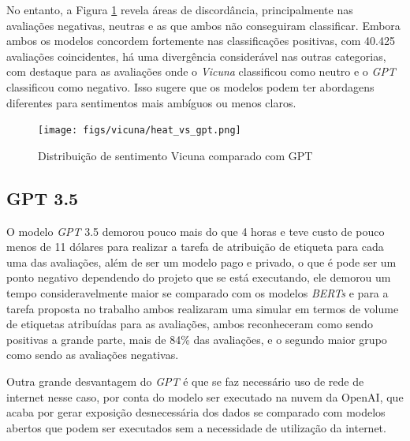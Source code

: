 No entanto, a Figura \ref{img:heat_vicuna_vs_gpt} revela áreas de discordância, principalmente nas avaliações negativas, neutras e as que ambos não conseguiram classificar. Embora ambos os modelos concordem fortemente nas classificações positivas, com 40.425 avaliações coincidentes, há uma divergência considerável nas outras categorias, com destaque para as avaliações onde o \textit{Vicuna} classificou como neutro e o \textit{GPT} classificou como negativo. Isso sugere que os modelos podem ter abordagens diferentes para sentimentos mais ambíguos ou menos claros.

\begin{figure}
	\centering
	\texttt{[image: figs/vicuna/heat\_vs\_gpt.png]}
	\caption{Distribuição de sentimento Vicuna comparado com GPT}
	\label{img:heat_vicuna_vs_gpt}
\end{figure}


\subsection{GPT 3.5}
\label{sec:resultados:subsec:gpt}


O modelo \textit{GPT} 3.5 demorou pouco mais do que 4 horas e teve custo de pouco menos de 11 dólares para realizar a tarefa de atribuição de etiqueta para cada uma das avaliações, além de ser um modelo pago e privado, o que é pode ser um ponto negativo dependendo do projeto que se está executando, ele demorou um tempo consideravelmente maior se comparado com os modelos \textit{BERTs} e para a tarefa proposta no trabalho ambos realizaram uma simular em termos de volume de etiquetas atribuídas para as avaliações, ambos reconheceram como sendo positivas a grande parte, mais de 84\% das avaliações, e o segundo maior grupo como sendo as avaliações negativas.

Outra grande desvantagem do \textit{GPT} é que se faz necessário uso de rede de internet nesse caso, por conta do modelo ser executado na nuvem da OpenAI, que acaba por gerar exposição desnecessária dos dados se comparado com modelos abertos que podem ser executados sem a necessidade de utilização da internet.

